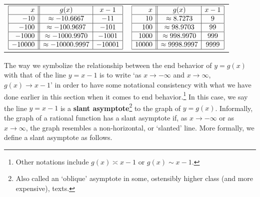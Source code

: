 \documentclass{ximera}
\begin{document}
\begin{center}
\begin{tabular}{cc}

$\begin{array}{|r||c|c|}  \hline

  x & g(x) & x-1 \\ \hline
 -10 & \approx -10.6667 & -11 \\  \hline
 -100 & \approx -100.9697 & -101 \\  \hline 
 -1000 &  \approx -1000.9970&   -1001 \\ \hline 
  -10000 &  \approx -10000.9997 &  -10001 \\ \hline 
  \end{array} $ & 

$\begin{array}{|r||c|c|}  \hline

  x & g(x) & x-1 \\ \hline
 10 & \approx 8.7273 &    9 \\\hline
 100 & \approx 98.9703 &   99 \\ \hline 
 1000 &  \approx 998.9970 &  999 \\ \hline 
  10000 &  \approx 9998.9997 &   9999 \\ \hline 
  \end{array} $ \\
  
  \end{tabular}
  \end{center}
  
  
\begin{center}
\end{center} 
 
The way we symbolize the relationship between the end behavior of $y=g(x)$ with that of the line $y=x-1$ is to write `as $x \rightarrow  -\infty$ and $x \rightarrow \infty$, $g(x) \rightarrow x-1$' in order to have some notational consistency with what we have done earlier in this section when it comes to end behavior.\footnote{Other notations include $g(x) \asymp x-1$ or $g(x) \sim x-1$.}  In this case, we say the line $y=x-1$ is a    \textbf{slant asymptote}\footnote{Also called an `oblique' asymptote in some, ostensibly higher class (and more expensive), texts.}  to the graph of $y=g(x)$.  Informally, the graph of a rational function has a slant asymptote if, as $x \rightarrow -\infty$ or as $x \rightarrow \infty$, the graph resembles a non-horizontal, or `slanted' line.  More formally, we define a slant asymptote as follows.
\end{document}
